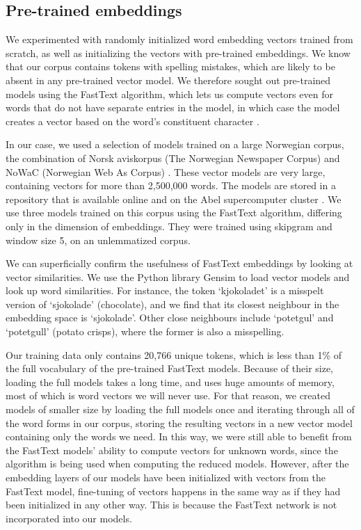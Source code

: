 \subsection{Pre-trained embeddings} \label{subseq:fasttext}

We experimented with randomly initialized word embedding vectors trained from
scratch, as well as initializing the vectors with pre-trained embeddings. We
know that our corpus contains tokens with spelling mistakes, which are likely
to be absent in any pre-trained vector model. We therefore sought out
pre-trained models using the FastText algorithm, which lets us compute
vectors even for words that do not have separate entries in the model, in
which case the model creates a vector based on the word's constituent
character \ngrams.

In our case, we used a selection of models trained on a large Norwegian
corpus, the combination of Norsk aviskorpus (The Norwegian Newspaper Corpus)
and NoWaC (Norwegian Web As Corpus) \autocite{stadsnes2018}. These vector
models are very large, containing vectors for more than 2,500,000 words. The
models are stored in a repository that is available online and on the Abel
supercomputer cluster \autocite{murhaf2017repository}. We use three models
trained on this corpus using the FastText algorithm, differing only in the
dimension of embeddings. They were trained using skipgram and window size 5, 
on an unlemmatized corpus.

We can superficially confirm the usefulness of FastText embeddings by looking
at vector similarities. We use the Python library Gensim \autocite{gensim} to
load vector models and look up word similarities. For instance, the token
`kjokoladet' is a misspelt version of `sjokolade' (chocolate), and we find
that its closest neighbour in the embedding space is `sjokolade'. Other close
neighbours include `potetgul' and `potetgull' (potato crisps), where the
former is also a misspelling.

Our training data only contains 20,766 unique tokens, which is less than 1\%
of the full vocabulary of the pre-trained FastText models. Because of their
size, loading the full models takes a long time, and uses huge amounts of
memory, most of which is word vectors we will never use. For that reason, we
created models of smaller size by loading the full models once and iterating
through all of the word forms in our corpus, storing the resulting vectors in
a new vector model containing only the words we need. In this way, we were
still able to benefit from the FastText models' ability to compute vectors
for unknown words, since the \ngram algorithm is being used when computing
the reduced models. However, after the embedding layers of our models have
been initialized with vectors from the FastText model, fine-tuning of vectors
happens in the same way as if they had been initialized in any other way.
This is because the FastText network is not incorporated into our models.

